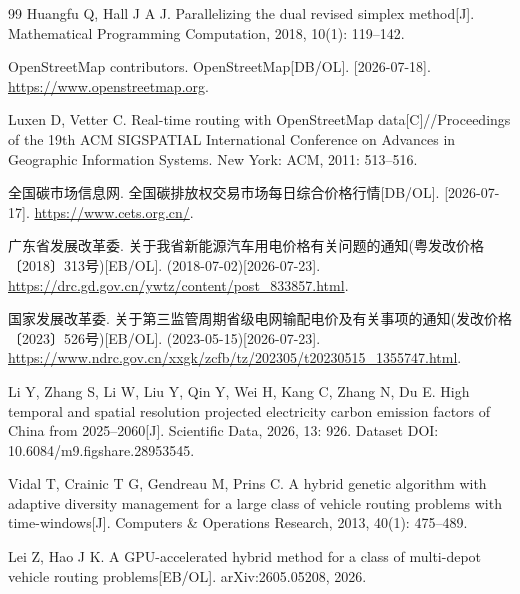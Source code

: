 \documentclass{setp-new}
\begin{document}
\begin{thebibliography}{99}
 Huangfu Q, Hall J A J. Parallelizing the dual revised simplex method[J]. Mathematical Programming Computation, 2018, 10(1): 119--142.

 OpenStreetMap contributors. OpenStreetMap[DB/OL]. [2026-07-18]. \url{https://www.openstreetmap.org}.

 Luxen D, Vetter C. Real-time routing with OpenStreetMap data[C]//Proceedings of the 19th ACM SIGSPATIAL International Conference on Advances in Geographic Information Systems. New York: ACM, 2011: 513--516.

 全国碳市场信息网. 全国碳排放权交易市场每日综合价格行情[DB/OL]. [2026-07-17]. \url{https://www.cets.org.cn/}.

 广东省发展改革委. 关于我省新能源汽车用电价格有关问题的通知(粤发改价格〔2018〕313号)[EB/OL]. (2018-07-02)[2026-07-23].
\url{https://drc.gd.gov.cn/ywtz/content/post_833857.html}.

 国家发展改革委. 关于第三监管周期省级电网输配电价及有关事项的通知(发改价格〔2023〕526号)[EB/OL]. (2023-05-15)[2026-07-23].
\url{https://www.ndrc.gov.cn/xxgk/zcfb/tz/202305/t20230515_1355747.html}.

 Li Y, Zhang S, Li W, Liu Y, Qin Y, Wei H, Kang C, Zhang N, Du E. High temporal and spatial resolution projected electricity carbon emission factors of China from 2025--2060[J]. Scientific Data, 2026, 13: 926. Dataset DOI: 10.6084/m9.figshare.28953545.

 Vidal T, Crainic T G, Gendreau M, Prins C. A hybrid genetic algorithm with adaptive diversity management for a large class of vehicle routing problems with time-windows[J]. Computers \& Operations Research, 2013, 40(1): 475--489.

 Lei Z, Hao J K. A GPU-accelerated hybrid method for a class of multi-depot vehicle routing problems[EB/OL]. arXiv:2605.05208, 2026.

\end{thebibliography}
\end{document}
